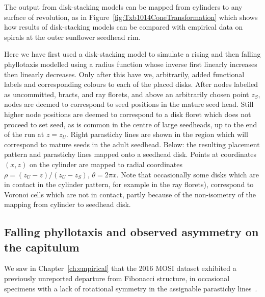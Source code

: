 The output from disk-stacking models can be mapped from cylinders to any surface of revolution, as in Figure~\ref{fig:Txb1014ConeTransformation} which shows how  results of disk-stacking models can be compared with empirical data on spirals at the outer sunflower seedhead rim. 

Here we have first used a disk-stacking model to simulate a rising and then falling phyllotaxis modelled using a radius function whose inverse first linearly increases then linearly decreases. Only after this have we, arbitrarily, added  functional labels and corresponding colours to each of the placed disks. After nodes labelled as uncommitted, bracts, and ray florets, and above an arbitrarily chosen point $z_S$, nodes are deemed to correspond to seed positions in the mature seed head.  Still higher node positions are deemed to correspond to a disk floret which does not proceed to set seed, as is common in the centre of large seedheads, up to the end of the run at $z=z_U$.   Right parastichy lines are shown in the region which will correspond to mature seeds in the adult seedhead. Below: the resulting placement pattern and parastichy lines mapped onto a seedhead disk. Points at coordinates $(x,z)$ on the cylinder are mapped to radial coordinates $\rho=(z_U-z)/(z_U-z_S)$, $\theta=2\pi x$. Note that occasionally some disks which are in contact in the cylinder pattern, for example in the ray florets), correspond to Voronoi cells which are not in  contact, partly because of the non-isometry of the mapping from cylinder to seedhead disk.
%

 
\clearpage
\subsection{Falling phyllotaxis and observed asymmetry on the capitulum}
We saw in Chapter~\ref{ch:empirical} that the 2016 MOSI dataset exhibited  a previously unreported departure from Fibonacci structure, in occasional specimens with a lack of rotational symmetry in the assignable parastichy lines~\cite{swintonNovelFibonacciNonFibonacci2016}. 

